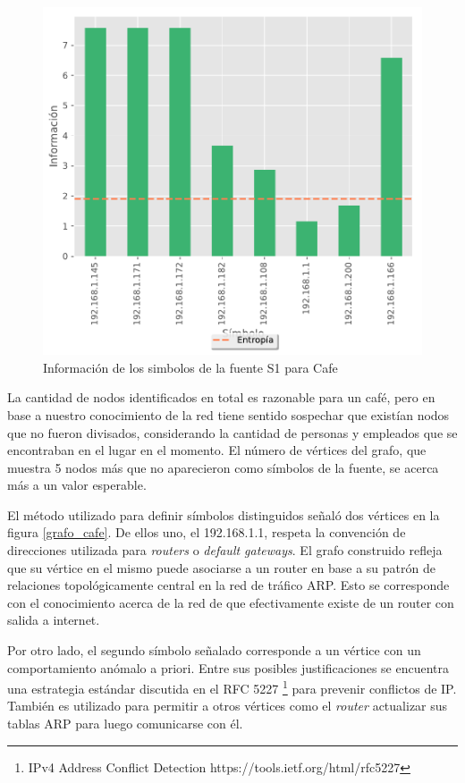 \begin{figure}[H]
  \begin{center}
    \includegraphics[scale = 0.5]{img/Cafe-information-S1.pdf}
    \caption{Información de los simbolos de la fuente S1 para Cafe}
    \label{informacion_cafe}
  \end{center}
\end{figure}

La cantidad de nodos identificados en total es razonable para un café, pero en base a nuestro conocimiento de la red tiene sentido sospechar que existían nodos que no fueron divisados, considerando la cantidad de personas y empleados que se encontraban en el lugar en el momento. El número de vértices del grafo, que muestra 5 nodos más que no aparecieron como símbolos de la fuente, se acerca más a un valor esperable.

El método utilizado para definir símbolos distinguidos señaló dos vértices en la figura \ref{grafo_cafe}. De ellos uno, el 192.168.1.1, respeta la convención de direcciones utilizada para \textit{routers} o \textit{default gateways}. El grafo construido refleja que su vértice en el mismo puede asociarse a un router en base a su patrón de relaciones topológicamente central en la red de tráfico ARP. Esto se corresponde con el conocimiento acerca de la red de que efectivamente existe de un router con salida a internet.

Por otro lado, el segundo símbolo señalado corresponde a un vértice con un comportamiento anómalo a priori. Entre sus posibles justificaciones se encuentra una estrategia estándar discutida en el RFC 5227 \footnote{IPv4 Address Conflict Detection https://tools.ietf.org/html/rfc5227} para prevenir conflictos de IP. También es utilizado para permitir a otros vértices como el \textit{router} actualizar sus tablas ARP para luego comunicarse con él.

